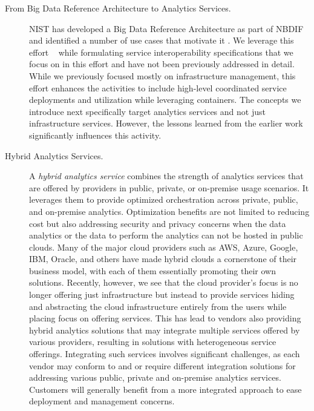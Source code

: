 \begin{description}

\item[From Big Data Reference Architecture to Analytics Services.]
\label{s:arch} NIST has developed a Big Data Reference Architecture as part of
NBDIF\cite{nist-v6} and identified a number of use cases that motivate
it \cite{nist-v3}. We leverage this effort
~\cite{nist-v1,nist-v2,nist-v3,nist-v4,nist-v5,nist-v6,nist-v7,nist-v8,nist-v9}
while formulating service interoperability specifications that we
focus on in this effort and have not been previously addressed in
detail. While we previously focused mostly on infrastructure
management, this effort enhances the activities to include high-level
coordinated service deployments and utilization while leveraging
containers. The concepts we introduce next specifically target
analytics services and not just infrastructure services.  However, the
lessons learned from the earlier work significantly influences this
activity.


\item[Hybrid Analytics Services.]

A {\em hybrid analytics service} combines the strength of analytics
services that are offered by providers in public, private, or
on-premise usage scenarios. It leverages them to provide optimized
orchestration across private, public, and on-premise
analytics. Optimization benefits are not limited to reducing cost but
also addressing security and privacy concerns when the data analytics
or the data to perform the analytics can not be hosted in public
clouds. Many of the major cloud providers such as AWS, Azure, Google,
IBM, Oracle, and others have made hybrid clouds a cornerstone of their
business model, with each of them essentially promoting their own
solutions. Recently, however, we see that the cloud provider's focus
is no longer offering just infrastructure but instead to provide
services hiding and abstracting the cloud infrastructure entirely from
the users while placing focus on offering services. This has lead to
vendors also providing hybrid analytics solutions that may integrate
multiple services offered by various providers, resulting in solutions
with heterogeneous service offerings. Integrating such services
involves significant challenges, as each vendor may conform to and or
require different integration solutions for addressing various public,
private and on-premise analytics services. Customers will generally
benefit from a more integrated approach to ease deployment and
management concerns.


\end{description}
